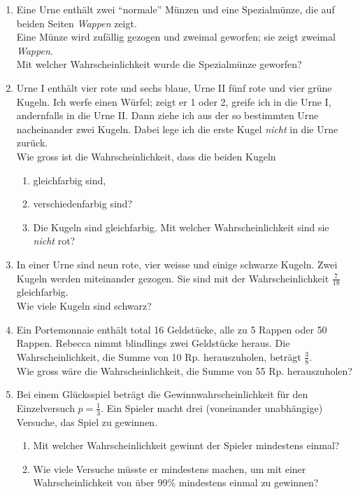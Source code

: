 \begin{ueb}
\begin{enumerate}
    \item Eine Urne enthält zwei ``normale'' Münzen und eine Spezialmünze, die auf beiden Seiten \emph{Wappen} zeigt.\\
          Eine Münze wird zufällig gezogen und zweimal geworfen; sie zeigt zweimal \emph{Wappen}.\\
          Mit welcher Wahrscheinlichkeit wurde die Spezialmünze geworfen?


    \item Urne I enthält vier rote und sechs blaue, Urne II fünf rote und vier grüne Kugeln. Ich werfe einen Würfel; zeigt er 1 oder 2, greife ich in die Urne I, andernfalls in die Urne II. Dann ziehe ich aus der so bestimmten Urne nacheinander zwei Kugeln. Dabei lege ich die erste Kugel \emph{nicht} in die Urne zurück.\\
          Wie gross ist die Wahrscheinlichkeit, dass die beiden Kugeln
          \begin{enumerate}
            \item gleichfarbig sind,
            \item verschiedenfarbig sind?
            \item Die Kugeln sind gleichfarbig. Mit welcher Wahrscheinlichkeit sind sie \emph{nicht} rot?
          \end{enumerate}


    \item In einer Urne sind neun rote, vier weisse und einige schwarze Kugeln. Zwei Kugeln werden miteinander gezogen. Sie sind mit der Wahrscheinlichkeit \( \frac{7}{18} \) gleichfarbig.\\
          Wie viele Kugeln sind schwarz?

    \item Ein Portemonnaie enthält total 16 Geldstücke, alle zu 5 Rappen oder 50 Rappen. Rebecca nimmt blindlings zwei Geldstücke heraus. Die Wahrscheinlichkeit, die Summe von 10 Rp. herauszuholen, beträgt \( \frac{3}{8} \).\\
          Wie gross wäre die Wahrscheinlichkeit, die Summe von 55 Rp. herauszuholen?

    \item Bei einem Glücksspiel beträgt die Gewinnwahrscheinlichkeit für den Einzelversuch \( p = \frac{1}{3} \). Ein Spieler macht drei (voneinander unabhängige) Versuche, das Spiel zu gewinnen.
          \begin{enumerate}
            \item Mit welcher Wahrscheinlichkeit gewinnt der Spieler mindestens einmal?
            \item Wie viele Versuche müsste er mindestens machen, um mit einer Wahrscheinlichkeit von über 99\% mindestens einmal zu gewinnen?
          \end{enumerate}


\end{enumerate}
\end{ueb}

